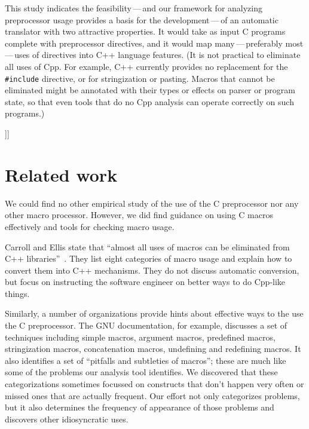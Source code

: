 \documentclass[11pt]{article}
\begin{document}
This study indicates the feasibility\,---\,and our framework for
analyzing preprocessor usage provides a basis for the
development\,---\,of an automatic translator with two attractive
properties.  It would take as input C programs complete with
preprocessor directives, and it would map many\,---\,preferably
most\,---\,uses of directives into C++ language features.  (It is not
practical to eliminate all uses of Cpp.  For example, C++ currently
provides no replacement for the {\tt \#include} directive, or for
stringization or pasting.  Macros that cannot be eliminated might be
annotated with their types or effects on parser or program state, so
that even tools that do no Cpp analysis can operate correctly on such
programs.)

]]



% 


\section{Related work}
\label{sec:related}

We could find no other empirical study of the use of the C preprocessor nor
any other macro processor.  However, we did find guidance on using C macros
effectively and tools for checking macro usage.

Carroll and Ellis state that ``almost all uses of macros can be eliminated
from C++ libraries''~\cite[p.~146]{Carroll95}.  They list eight categories
of macro usage and explain how to convert them into C++ mechanisms.  They
do not discuss automatic conversion, but focus on instructing the software
engineer on better ways to do Cpp-like things.

Similarly, a number of organizations provide hints about effective ways to
the use the C preprocessor.  The GNU documentation, for example, discusses
a set of techniques including simple macros, argument macros, predefined
macros, stringization macros, concatenation macros, undefining and
redefining macros.  It also identifies a set of ``pitfalls and subtleties
of macros''; these are much like some of the problems our analysis tool
identifies.  We discovered that these categorizations sometimes focussed on
constructs that don't happen very often or missed ones that are actually
frequent.  Our effort not only categorizes problems, but it also determines
the frequency of appearance of those problems and discovers other
idiosyncratic uses.
\end{document}
